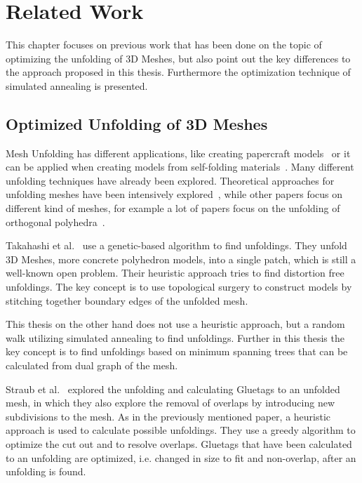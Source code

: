 \documentclass[draft,final]{vutinfth} %
\begin{document}
\chapter{Related Work}
\label{chap:relatedwork}
This chapter focuses on previous work that has been done on the topic of optimizing the unfolding of 3D Meshes, but also point out the key differences to the approach proposed in this thesis. Furthermore the optimization technique of simulated annealing is presented.

\section{Optimized Unfolding of 3D Meshes}

Mesh Unfolding has different applications, like creating papercraft models~\cite{takahashi2011optimized,straubcreating} or it can be applied when creating models from self-folding materials~\cite{felton2013self,tibbits20144d}. Many different unfolding techniques have already been explored. Theoretical approaches for unfolding meshes have been intensively explored~\cite{shephard1975convex}, while other papers focus on different kind of meshes, for example a lot of papers focus on the unfolding of orthogonal polyhedra~\cite{xi2016learning,damian2007epsilon,damian2014unfolding}.

Takahashi et al.~\cite{takahashi2011optimized} use a genetic-based algorithm to find unfoldings. They unfold 3D Meshes, more concrete polyhedron models, into a single patch, which is still a well-known open problem. Their heuristic approach tries to find distortion free unfoldings. The key concept is to use topological surgery to construct models by stitching together boundary edges of the unfolded mesh.

This thesis on the other hand does not use a heuristic approach, but a random walk utilizing simulated annealing to find unfoldings. Further in this thesis the key concept is to find unfoldings based on minimum spanning trees that can be calculated from dual graph of the mesh.

Straub et al.~\cite{straubcreating} explored the unfolding and calculating Gluetags to an unfolded mesh, in which they also explore the removal of overlaps by introducing new subdivisions to the mesh. As in the previously mentioned paper, a heuristic approach is used to calculate possible unfoldings. They use a greedy algorithm to optimize the cut out and to resolve overlaps. Gluetags that have been calculated to an unfolding are optimized, i.e. changed in size to fit and non-overlap, after an unfolding is found.
\end{document}
